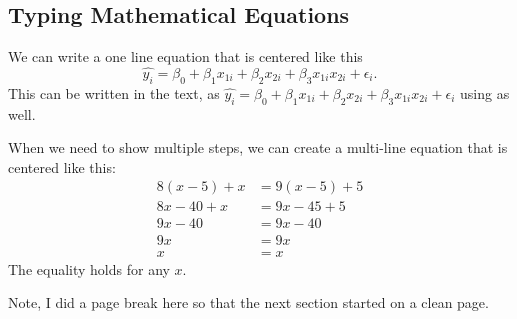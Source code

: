 \documentclass{article}\usepackage[]{graphicx}\usepackage[]{xcolor}
\begin{document}
\begin{multicols}{2}
\subsection{Typing Mathematical Equations}
We can write a one line equation that is centered like this
\[\widehat{y_i} = \beta_0 + \beta_1 x_{1i}+ \beta_2 x_{2i} + \beta_3 x_{1i} x_{2i} + \epsilon_i.\]
This can be written in the text, as $\widehat{y_i} = \beta_0 + \beta_1 x_{1i}+ \beta_2 x_{2i} + \beta_3 x_{1i} x_{2i} + \epsilon_i$ using as well.

When we need to show multiple steps, we can create a multi-line equation that is centered like this:
\begin{align*}
8(x-5) + x &= 9(x-5) + 5\\
8x-40+x &= 9x-45 +5 \tag{Distributing}\\
9x-40 &= 9x-40 \tag{Combining like terms}\\
9x &= 9x \tag{Adding 40 to both sides}\\
x &= x \tag{Dividing both sides by 9}
\end{align*}
The equality holds for any $x$.

Note, I did a page break here so that the next section started on a clean page.
\newpage


\end{multicols}
\end{document}
